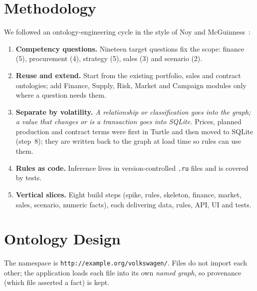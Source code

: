 \documentclass[conference]{IEEEtran}
\begin{document}
\section{Methodology}
We followed an ontology-engineering cycle in the style of Noy and McGuinness~\cite{noy}:
\begin{enumerate}
\item \textbf{Competency questions.} Nineteen target questions fix the scope: finance (5), procurement (4), strategy (5), sales (3) and scenario (2).
\item \textbf{Reuse and extend.} Start from the existing portfolio, sales and contract ontologies; add Finance, Supply, Risk, Market and Campaign modules only where a question needs them.
\item \textbf{Separate by volatility.} \emph{A relationship or classification goes into the graph; a value that changes or is a transaction goes into SQLite.} Prices, planned production and contract terms were first in Turtle and then moved to SQLite (step~8); they are written back to the graph at load time so rules can use them.
\item \textbf{Rules as code.} Inference lives in version-controlled \texttt{.ru} files and is covered by tests.
\item \textbf{Vertical slices.} Eight build steps (spike, rules, skeleton, finance, market, sales, scenario, numeric facts), each delivering data, rules, API, UI and tests.
\end{enumerate}

\section{Ontology Design}
The namespace is \texttt{http://example.org/volkswagen/}. Files do not import each other; the application loads each file into its own \emph{named graph}, so provenance (which file asserted a fact) is kept.
\end{document}
